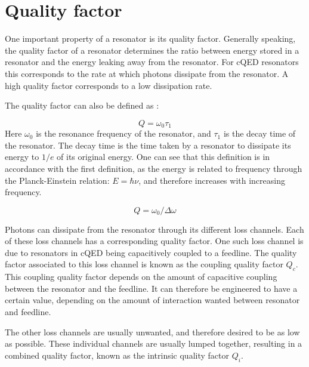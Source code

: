 \documentclass[12pt]{report}
\begin{document}
\section{Quality factor}
\label{sec:Quality factor}
One important property of a resonator is its quality factor. Generally speaking, the quality factor of a resonator determines the ratio between energy stored in a resonator and the energy leaking away from the resonator. For cQED resonators this corresponds to the rate at which photons dissipate from the resonator. A high quality factor corresponds to a low dissipation rate.

The quality factor can also be defined as \cite[p.~23]{Mazin}:

\begin{equation}
    Q = \omega_0 \tau_1
\end{equation}
Here $\omega_0$ is the resonance frequency of the resonator, and $\tau_1$ is the decay time of the resonator. The decay time is the time taken by a resonator to dissipate its energy to $1/e$ of its original energy. One can see that this definition is in accordance with the first definition, as the energy is related to frequency through the Planck-Einstein relation: $E = \hbar \nu$, and therefore increases with increasing frequency.

\begin{equation}
    Q = \omega_0 / \Delta \omega
    \label{eq:FWHM}
\end{equation}

Photons can dissipate from the resonator through its different loss channels. Each of these loss channels has a corresponding quality factor. One such loss channel is due to resonators in cQED being capacitively coupled to a feedline. The quality factor associated to this loss channel is known as the coupling quality factor $Q_c$. This coupling quality factor depends on the amount of capacitive coupling between the resonator and the feedline. It can therefore be engineered to have a certain value, depending on the amount of interaction wanted between resonator and feedline.

The other loss channels are usually unwanted, and therefore desired to be as low as possible. These individual channels are usually lumped together, resulting in a combined quality factor, known as the intrinsic quality factor $Q_i$.
\end{document}
